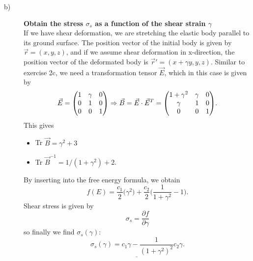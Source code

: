 \documentclass[norsk,a4paper,12pt]{article}
\begin{document}
\begin{description}
\item [b)] \textbf{Obtain the stress $\sigma_s$ as a function of the shear strain $\gamma$}\\
If we have shear deformation, we are stretching the elastic body parallel to its ground surface. The position vector of the initial body is given by $\vec{r}=(x,y,z)$, and if we assume shear deformation in x-direction, the position vector of the deformated body is $\vec{r}'=(x+\gamma y,y,z)$. Similar to exercise 2c, we need a transformation tensor $\vec{E}$, which in this case is given by
$$\vec{E}=\mqty(1&\gamma&0\\0&1&0\\0&0&1)\Rightarrow \vec{B}=\vec{E}\cdot\vec{E}^T=\mqty(1+\gamma^2&\gamma&0\\\gamma&1&0\\0&0&1).$$
This gives
\begin{itemize}
\item Tr $\vec{B}=\gamma^2+3$
\item Tr $\vec{B}^{-1}=1/(1+\gamma^2)+2.$
\end{itemize}
By inserting into the free energy formula, we obtain
\begin{equation}
f(E)=\frac{c_1}{2}\bigg(\gamma^2\bigg)+\frac{c_2}{2}\bigg(\frac{1}{1+\gamma^2}-1\bigg).
\end{equation}
Shear stress is given by
\begin{equation}
\sigma_s=\frac{\partial f}{\partial \gamma}
\end{equation}
so finally we find $\sigma_s(\gamma)$:
\begin{equation}
\underline{\sigma_s(\gamma)=c_1\gamma-\frac{1}{(1+\gamma^2)^2}c_2\gamma}.
\end{equation}


\end{description}
\end{document}
